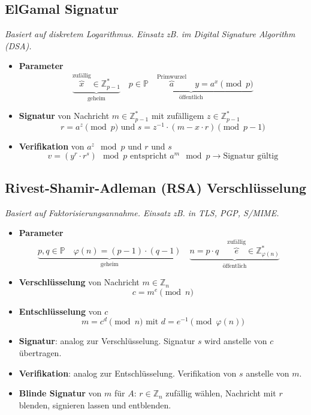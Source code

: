 \documentclass{article}
\begin{document}
\subsection{ElGamal Signatur}
\textit{Basiert auf diskretem Logarithmus. Einsatz zB. im Digital Signature Algorithm (DSA).}
\begin{itemize}
  \item \textbf{Parameter}
    \[
      \underbrace{\overbrace{x}^\text{zufällig}\in\mathbb{Z}^*_{p-1}}_\text{geheim}\quad
      \underbrace{p\in\mathbb{P} \quad \overbrace{a}^\text{Primwurzel} \quad y = a^{x} \pmod{p}}_\text{öffentlich}
    \]
  \item \textbf{Signatur} von Nachricht $m\in\mathbb{Z}^*_{p-1}$ mit zufälligem $z\in\mathbb{Z}^*_{p-1}$
    \[ r = a^z \pmod{p} \text{ und } s = z^{-1} \cdot (m - x \cdot r) \pmod{p-1} \]
  \item \textbf{Verifikation} von $a^z \mod{p}$ und $r$ und $s$
    \[ v = (y^r \cdot r^s) \mod{p} \text{ entspricht } a^m \mod{p} \to \text{Signatur gültig} \]
\end{itemize}

\subsection{Rivest-Shamir-Adleman (RSA) Verschlüsselung}
\textit{Basiert auf Faktorisierungsannahme. Einsatz zB. in TLS, PGP, S/MIME.}
\begin{itemize}
  \item \textbf{Parameter}
    \[
      \underbrace{p,q\in\mathbb{P} \quad \varphi(n)=(p-1)\cdot(q-1)}_\text{geheim}\quad
      \underbrace{n=p\cdot q \quad \overbrace{e}^\text{zufällig}\in\mathbb{Z}^*_{\varphi(n)}}_\text{öffentlich}\quad
    \]
  \item \textbf{Verschlüsselung} von Nachricht $m\in\mathbb{Z}_n$
    \[ c = m^e \pmod{n} \]
  \item \textbf{Entschlüsselung} von $c$
    \[ m = c^d \pmod{n} \text{ mit } d=e^{-1} \pmod{\varphi(n)}\]
  \item \textbf{Signatur}: analog zur Verschlüsselung. Signatur $s$ wird anstelle von $c$ übertragen.
  \item \textbf{Verifikation}: analog zur Entschlüsselung. Verifikation von $s$ anstelle von $m$.
  \item \textbf{Blinde Signatur} von $m$ für $A$: $r\in\mathbb{Z}_n$ zufällig wählen, Nachricht mit $r$ blenden, signieren lassen und entblenden.
\end{itemize}
\end{document}
